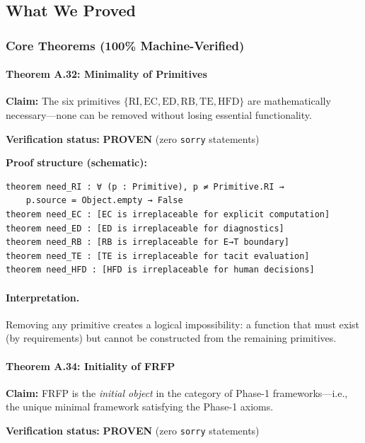 \subsection{What We Proved}

\subsubsection{Core Theorems (100\% Machine-Verified)}

\paragraph{Theorem A.32: Minimality of Primitives \checkmark}
\textbf{Claim:} The six primitives $\{\mathrm{RI}, \mathrm{EC}, \mathrm{ED}, \mathrm{RB}, \mathrm{TE}, \mathrm{HFD}\}$ are mathematically necessary—none can be removed without losing essential functionality.

\textbf{Verification status:} \textbf{PROVEN} (zero \texttt{sorry} statements)

\textbf{Proof structure (schematic):}
\begin{verbatim}
theorem need_RI : ∀ (p : Primitive), p ≠ Primitive.RI →
    p.source = Object.empty → False
theorem need_EC : [EC is irreplaceable for explicit computation]
theorem need_ED : [ED is irreplaceable for diagnostics]
theorem need_RB : [RB is irreplaceable for E→T boundary]
theorem need_TE : [TE is irreplaceable for tacit evaluation]
theorem need_HFD : [HFD is irreplaceable for human decisions]
\end{verbatim}

\paragraph{Interpretation.}
Removing any primitive creates a logical impossibility: a function that must exist (by requirements) but cannot be constructed from the remaining primitives.

\paragraph{Theorem A.34: Initiality of FRFP \checkmark}
\textbf{Claim:} FRFP is the \emph{initial object} in the category of Phase-1 frameworks—i.e., the unique minimal framework satisfying the Phase-1 axioms.

\textbf{Verification status:} \textbf{PROVEN} (zero \texttt{sorry} statements)

